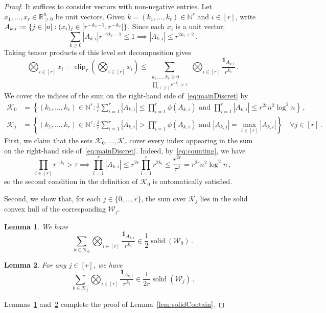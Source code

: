 \documentclass[10pt,a4paper]{amsart}
\newtheorem{lemma}{Lemma}
\newcommand{\N}{\mathbb{N}}
\newcommand{\R}{\mathbb{R}}
\newcommand{\calK}{\mathcal{K}}
\newcommand{\calW}{\mathcal{W}}
\DeclareMathOperator{\clip}{clip}
\newcommand\defeq{\vcentcolon=}
\renewcommand{\ge}{\geqslant}
\renewcommand{\le}{\leqslant}
\DeclareMathOperator{\solid}{solid}
\begin{document}
\begin{proof}
    It suffices to consider
    vectors with non-negative entries. Let $x_1, \ldots, x_r\in \R^n_{\ge 0}$ be unit vectors.
    Given
    $k=(k_1, \ldots, k_r)\in\N^r$ and $i\in [r]$, write
    $A_{k,i} \defeq \{j\in [n] : (x_i)_j\in [r^{-k_i-1}, r^{-k_i}]\}$.
    Since each $x_i$ is a unit vector,
    \begin{equation}
        \sum_{k\ge 0} |A_{k,i}| r^{-2k_i-2} \le 1\implies |A_{k,i}|\le r^{2k_i+2}\,.\label{eq:counting}
    \end{equation}
    Taking tensor products of this level set
    decomposition gives
    \begin{equation}
        \bigotimes_{i\in [r]} x_i - \clip_\tau\left(\bigotimes_{i\in [r]} x_i\right)\le \sum_{\substack{k_1, \ldots, k_r\ge 0\\\prod\limits_{i\in [r]}r^{-k_i}>\tau}} \bigotimes_{i\in [r]} \frac{\mathbf 1_{A_{k,i}}}{r^{k_i}}\,.\label{eq:mainDiscret}
    \end{equation}
    We cover the indices of the sum on the right-hand side of~\eqref{eq:mainDiscret} by
    \begin{align*}
        \calK_{0} &= \left\{(k_1, \ldots, k_r)\in \N^r:
        \frac 1r \sum_{i=1}^r |A_{k,i}|\le \prod_{i=1}^r \phi(A_{k,i})\text{ and } \prod_{i=1}^r |A_{k,i}|\le r^{2r} n^2\log^2 n\right\}\,,\\
        \calK_{j} &= \left\{(k_1, \ldots, k_r)\in \N^r : \frac 1r \sum_{i=1}^r |A_{k,i}| > \prod_{i=1}^r \phi(A_{k,i}) \text{ and } |A_{k,j}| = \max_{i\in [r]} |A_{k,i}|\right\}\quad \forall j\in [r]\,.
    \end{align*}
    First, we claim that 
    the sets $\calK_0,\ldots,\calK_r$
    cover every index appearing in the sum on 
    the right-hand side
    of~\eqref{eq:mainDiscret}. Indeed, by~\eqref{eq:counting}, we have
    \[
        \prod_{i\in [r]} r^{-k_i}>\tau \implies \prod_{i=1}^r |A_{k,i}|\le r^{2r} \prod_{i=1}^r r^{2k_i}\le \frac {r^{2r}} {\tau^2} = r^{2r} n^2 \log^2 n\,,
    \]
    so the second condition
    in the definition of $\calK_0$
    is automatically satisfied.

    Second, we show that, for each $j\in \{0, \ldots, r\}$, the sum over $\calK_j$
    lies in the solid convex hull
    of the corresponding $\calW_j$.
    
    \begin{lemma}\label{lemma:bSum}
    We have
    \[
        \sum_{k\in \calK_0} \bigotimes_{i\in [r]} \frac {\mathbf 1_{A_{k,i}}} {r^{k_i}} \in \frac12 \solid(\calW_0)\,.
    \]
    \end{lemma}
    
    \begin{lemma}\label{lemma:uSum}
        For any $j\in [r]$, we have
        \[\sum_{k\in \calK_j} \bigotimes_{i\in [r]} \frac {\mathbf 1_{A_{k,i}}} {r^{k_i}}  \in \frac 1{2r}  \solid(\calW_j)\,.
        \]
    \end{lemma}
    
    \noindent Lemmas~\ref{lemma:bSum}
    and~\ref{lemma:uSum} complete the proof of Lemma~\ref{lem:solidContain}.
\end{proof}
\end{document}
